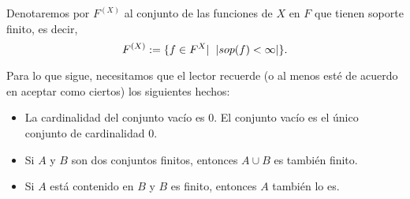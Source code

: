 \begin{defi}
Denotaremos por $F^{(X)}$ al conjunto de las funciones
de $X$ en $F$ que tienen soporte finito, es decir,
\[F^{(X)} := \{ f \in F^{X}  | \hspace{0.2cm}  
|sop(f) < \infty|\}.
\]
\end{defi}


Para lo que sigue, necesitamos que el lector recuerde
(o al menos esté de acuerdo en aceptar como ciertos)
los siguientes hechos:
\begin{itemize}
	\item La cardinalidad del conjunto vacío es $0$.
	El conjunto vacío es el único conjunto de cardinalidad $0$.
	\item Si $A$ y $B$ son dos conjuntos finitos, entonces
	$A \cup B$ es también finito.
	\item Si $A$ está contenido en $B$ y $B$ es finito, entonces
	$A$ también lo es.
\end{itemize}

